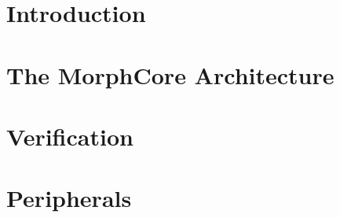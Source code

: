 \documentclass{report}
\begin{document}

\tableofcontents
\newpage

\chapter{Introduction}



\chapter{The MorphCore Architecture}




\chapter{Verification}


\chapter{Peripherals}


\printindex
\end{document}
